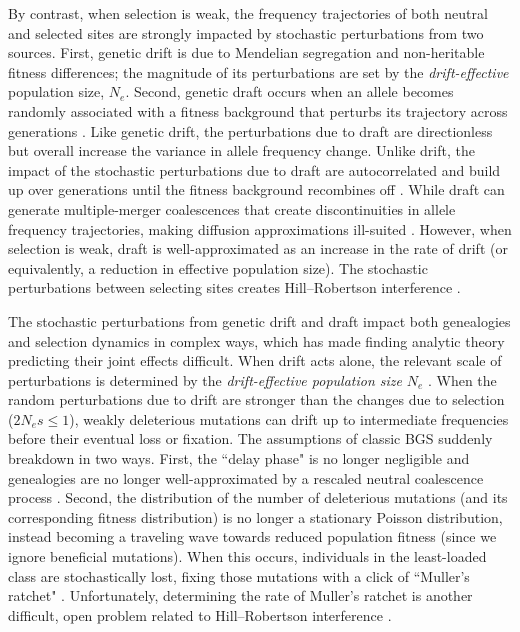\documentclass[11pt]{article}
\begin{document}
By contrast, when selection is weak, the frequency trajectories of both neutral
and selected sites are strongly impacted by stochastic perturbations from two
sources. First, genetic drift is due to Mendelian segregation and non-heritable
fitness differences; the magnitude of its perturbations are set by the
\emph{drift-effective} population size, $N_e$. Second, genetic draft occurs
when an allele becomes randomly associated with a fitness background that
perturbs its trajectory across generations \parencite{Neher2013-dz}. Like
genetic drift, the perturbations due to draft are directionless but overall
increase the variance in allele frequency change. Unlike drift, the impact of
the stochastic perturbations due to draft are autocorrelated and build up over
generations until the fitness background recombines off
\parencite{Robertson1961-ho,Santiago1995-hx,Buffalo2019-qs}. While draft can
generate multiple-merger coalescences that create discontinuities in allele
frequency trajectories, making diffusion approximations ill-suited
\parencite{Gillespie2000-mh,Der2011-it,Neher2013-dz}. However, when selection
is weak, draft is well-approximated as an increase in the rate of drift (or
equivalently, a reduction in effective population size). The stochastic
perturbations between selecting sites creates Hill--Robertson interference
\parencite{Hill1966-kd}.

The stochastic perturbations from genetic drift and draft impact both
genealogies and selection dynamics in complex ways, which has made finding
analytic theory predicting their joint effects difficult. When drift acts
alone, the relevant scale of perturbations is determined by the
\emph{drift-effective population size} $N_e$
\parencite{Ohta1971-gq,Ohta1992-yi}. When the random perturbations due to drift
are stronger than the changes due to selection ($2N_es \le 1$), weakly
deleterious mutations can drift up to intermediate frequencies before their
eventual loss or fixation. The assumptions of classic BGS suddenly breakdown in
two ways. First, the ``delay phase" is no longer negligible and genealogies are
no longer well-approximated by a rescaled neutral coalescence process
\parencite{Przeworski1999-mb,OFallon2010-my,Higgs1995-xc}. Second, the
distribution of the number of deleterious mutations (and its corresponding
fitness distribution) is no longer a stationary Poisson distribution, instead
becoming a traveling wave \parencite{Rouzine2008-qz,Good2013-lp,Gessler1995-hz}
towards reduced population fitness (since we ignore beneficial mutations). When
this occurs, individuals in the least-loaded class are stochastically lost,
fixing those mutations with a click of ``Muller's ratchet"
\parencite{Muller1964-ki,Charlesworth1997-qn}. Unfortunately, determining the
rate of Muller's ratchet is another difficult, open problem
\parencite{Haigh1978-gt,Gordo2002-dr,Gessler1995-hz} related to Hill--Robertson
interference \parencite{Felsenstein1974-xm}.
\end{document}
